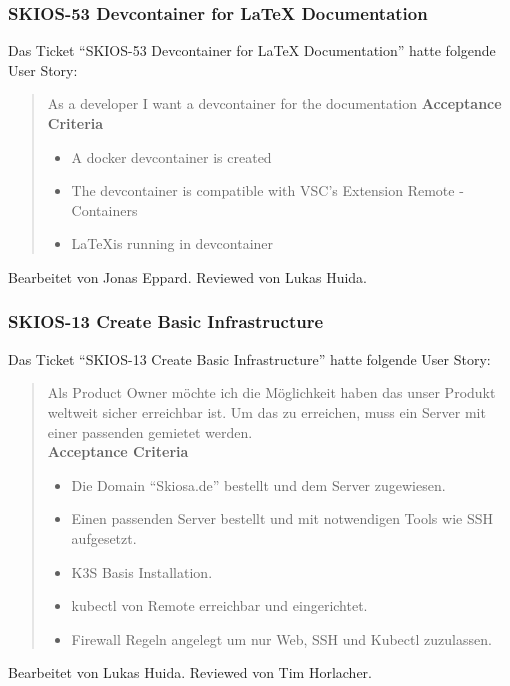 \subsubsection{SKIOS-53 Devcontainer for LaTeX Documentation}
Das Ticket \enquote{SKIOS-53 Devcontainer for LaTeX Documentation} hatte folgende User Story:
\begin{quotation}
    As a developer I want a devcontainer for the documentation
\textbf{Acceptance Criteria}
\begin{itemize}
    \item A docker devcontainer is created
    \item The devcontainer is compatible with \ac{VSC}'s Extension Remote - Containers
    \item \LaTeX is running in devcontainer
\end{itemize}
\end{quotation}
Bearbeitet von Jonas Eppard.
Reviewed von Lukas Huida.

\subsubsection{SKIOS-13 Create Basic Infrastructure}
Das Ticket \enquote{SKIOS-13 Create Basic Infrastructure} hatte folgende User Story:
\begin{quotation}
    Als Product Owner möchte ich die Möglichkeit haben das unser Produkt weltweit sicher erreichbar ist. Um das zu erreichen, muss ein Server mit einer passenden gemietet werden. \\
    \textbf{Acceptance Criteria}
    \begin{itemize}
        \item Die Domain \enquote{Skiosa.de} bestellt und dem Server zugewiesen.
        \item Einen passenden Server bestellt und mit notwendigen Tools wie SSH aufgesetzt.
        \item K3S Basis Installation.
        \item kubectl von Remote erreichbar und eingerichtet.
        \item Firewall Regeln angelegt um nur Web, SSH und Kubectl zuzulassen.
    \end{itemize} 
\end{quotation}
Bearbeitet von Lukas Huida.
Reviewed von Tim Horlacher.


